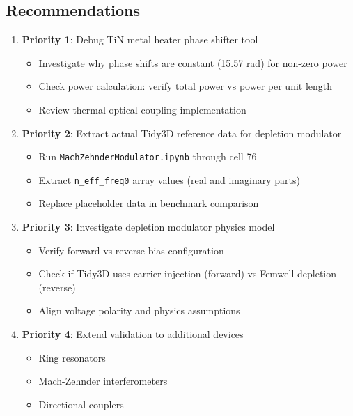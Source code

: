 \documentclass[11pt,a4paper]{article}
\begin{document}
\subsection{Recommendations}
\begin{enumerate}
    \item \textbf{Priority 1}: Debug TiN metal heater phase shifter tool
    \begin{itemize}
        \item Investigate why phase shifts are constant (15.57 rad) for non-zero power
        \item Check power calculation: verify total power vs power per unit length
        \item Review thermal-optical coupling implementation
    \end{itemize}

    \item \textbf{Priority 2}: Extract actual Tidy3D reference data for depletion modulator
    \begin{itemize}
        \item Run \texttt{MachZehnderModulator.ipynb} through cell 76
        \item Extract \texttt{n\_eff\_freq0} array values (real and imaginary parts)
        \item Replace placeholder data in benchmark comparison
    \end{itemize}

    \item \textbf{Priority 3}: Investigate depletion modulator physics model
    \begin{itemize}
        \item Verify forward vs reverse bias configuration
        \item Check if Tidy3D uses carrier injection (forward) vs Femwell depletion (reverse)
        \item Align voltage polarity and physics assumptions
    \end{itemize}

    \item \textbf{Priority 4}: Extend validation to additional devices
    \begin{itemize}
        \item Ring resonators
        \item Mach-Zehnder interferometers
        \item Directional couplers
    \end{itemize}
\end{enumerate}
\end{document}
